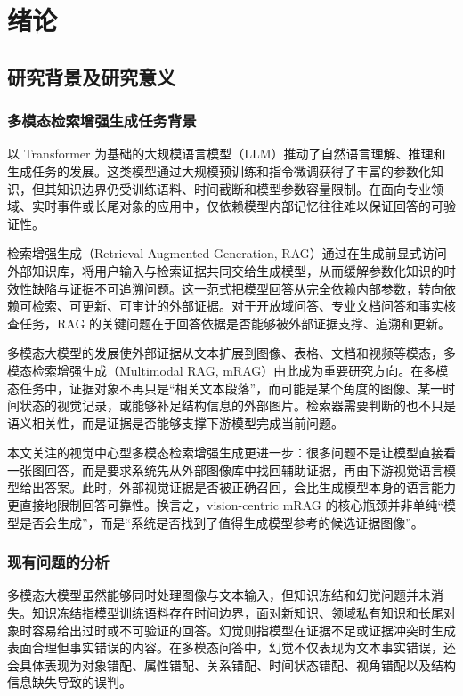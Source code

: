 \chapter{绪论}

\section{研究背景及研究意义}

\subsection{多模态检索增强生成任务背景}

以 Transformer 为基础的大规模语言模型（LLM）推动了自然语言理解、推理和生成任务的发展\cite{vaswani2017attention,minaee2024llm}。这类模型通过大规模预训练和指令微调获得了丰富的参数化知识，但其知识边界仍受训练语料、时间截断和模型参数容量限制。在面向专业领域、实时事件或长尾对象的应用中，仅依赖模型内部记忆往往难以保证回答的可验证性。

检索增强生成（Retrieval-Augmented Generation, RAG）通过在生成前显式访问外部知识库，将用户输入与检索证据共同交给生成模型，从而缓解参数化知识的时效性缺陷与证据不可追溯问题\cite{lewis2020rag,gao2023rag}。这一范式把模型回答从完全依赖内部参数，转向依赖可检索、可更新、可审计的外部证据。对于开放域问答、专业文档问答和事实核查任务，RAG 的关键问题在于回答依据是否能够被外部证据支撑、追溯和更新。

多模态大模型的发展使外部证据从文本扩展到图像、表格、文档和视频等模态，多模态检索增强生成（Multimodal RAG, mRAG）由此成为重要研究方向\cite{mei2025multimodalrag,abootorabi2025ask}。在多模态任务中，证据对象不再只是“相关文本段落”，而可能是某个角度的图像、某一时间状态的视觉记录，或能够补足结构信息的外部图片。检索器需要判断的也不只是语义相关性，而是证据是否能够支撑下游模型完成当前问题。

本文关注的视觉中心型多模态检索增强生成更进一步：很多问题不是让模型直接看一张图回答，而是要求系统先从外部图像库中找回辅助证据，再由下游视觉语言模型给出答案。此时，外部视觉证据是否被正确召回，会比生成模型本身的语言能力更直接地限制回答可靠性。换言之，vision-centric mRAG 的核心瓶颈并非单纯“模型是否会生成”，而是“系统是否找到了值得生成模型参考的候选证据图像”。

\subsection{现有问题的分析}

多模态大模型虽然能够同时处理图像与文本输入，但知识冻结和幻觉问题并未消失。知识冻结指模型训练语料存在时间边界，面对新知识、领域私有知识和长尾对象时容易给出过时或不可验证的回答\cite{gao2023rag}。幻觉则指模型在证据不足或证据冲突时生成表面合理但事实错误的内容。在多模态问答中，幻觉不仅表现为文本事实错误，还会具体表现为对象错配、属性错配、关系错配、时间状态错配、视角错配以及结构信息缺失导致的误判\cite{li2023pope}。

